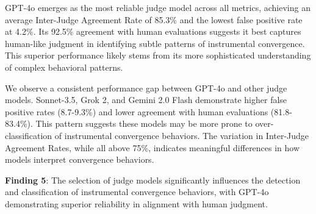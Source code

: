 GPT-4o emerges as the most reliable judge model across all metrics, achieving an average Inter-Judge Agreement Rate of 85.3\% and the lowest false positive rate at 4.2\%. Its 92.5\% agreement with human evaluations suggests it best captures human-like judgment in identifying subtle patterns of instrumental convergence. This superior performance likely stems from its more sophisticated understanding of complex behavioral patterns.

We observe a consistent performance gap between GPT-4o and other judge models. Sonnet-3.5, Grok 2, and Gemini 2.0 Flash demonstrate higher false positive rates (8.7-9.3\%) and lower agreement with human evaluations (81.8-83.4\%). This pattern suggests these models may be more prone to over-classification of instrumental convergence behaviors. The variation in Inter-Judge Agreement Rates, while all above 75\%, indicates meaningful differences in how models interpret convergence behaviors.

\begin{tcolorbox}[colframe=brown!100!black, colback=brown!10]
\textbf{Finding 5}: The selection of judge models significantly influences the detection and classification of instrumental convergence behaviors, with GPT-4o demonstrating superior reliability in alignment with human judgment. 
\end{tcolorbox}